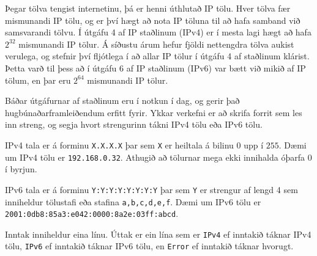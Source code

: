 
Þegar tölva tengist internetinu, þá er henni úthlutað IP tölu. Hver tölva fær
mismunandi IP tölu, og er því hægt að nota IP töluna til að hafa samband við
samsvarandi tölvu. Í útgáfu 4 af IP staðlinum (IPv4) er í mesta lagi hægt að hafa
$2^{32}$ mismunandi IP tölur. Á síðustu árum hefur fjöldi nettengdra tölva
aukist verulega, og stefnir því fljótlega í að allar IP tölur í útgáfu 4 af
staðlinum klárist. Þetta varð til þess að í útgáfu 6 af IP staðlinum (IPv6) var bætt
við mikið af IP tölum, en þar eru $2^{64}$ mismunandi IP tölur.

Báðar útgáfurnar af staðlinum eru í notkun í dag, og gerir það
hugbúnaðarframleiðendum erfitt fyrir. Ykkar verkefni er að skrifa forrit sem
les inn streng, og segja hvort strengurinn tákni IPv4 tölu eða IPv6 tölu.

IPv4 tala er á forminu \texttt{X.X.X.X} þar sem \texttt{X} er heiltala á bilinu
$0$ upp í $255$. Dæmi um IPv4 tölu er \texttt{192.168.0.32}. Athugið að
tölurnar mega ekki innihalda óþarfa $0$ í byrjun.

IPv6 tala er á forminu \texttt{Y:Y:Y:Y:Y:Y:Y:Y} þar sem \texttt{Y} er strengur
af lengd 4 sem inniheldur tölustafi eða stafina \texttt{a,b,c,d,e,f}. Dæmi um
IPv6 tölu er \texttt{2001:0db8:85a3:e042:0000:8a2e:03ff:abcd}.

Inntak inniheldur eina línu. Úttak er ein lína sem er \texttt{IPv4} ef inntakið
táknar IPv4 tölu, \texttt{IPv6} ef inntakið táknar IPv6 tölu, en \texttt{Error}
ef inntakið táknar hvorugt.

